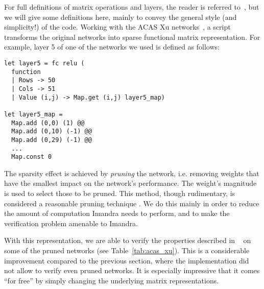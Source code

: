 \documentclass[runningheads]{llncs}
\begin{document}
For full definitions of matrix operations and layers, the reader is referred to~\cite{DPKD22}, but we will give some definitions here, mainly to convey the general style (and simplicity!) of the code.  Working with the ACAS Xu networks~\cite{KaBaDiJuKo17Reluplex}, a script transforms the original networks into sparse functional matrix representation.
For example, layer 5 of one of the networks we used is defined as follows:

\begin{lstlisting}[language=caml]
let layer5 = fc relu (
  function
  | Rows -> 50
  | Cols -> 51
  | Value (i,j) -> Map.get (i,j) layer5_map)

let layer5_map =
  Map.add (0,0) (1) @@
  Map.add (0,10) (-1) @@
  Map.add (0,29) (-1) @@
  ...
  Map.const 0
\end{lstlisting}

\noindent The sparsity effect is achieved by \emph{pruning} the network, i.e. removing weights that have the smallest impact on the network's performance. The weight's magnitude is used to select those to be pruned. This method, though rudimentary, is considered a reasonable pruning technique \cite{lecun_optimal_1989}.
%
We do this mainly in order to reduce the amount of computation Imandra needs to perform, and to make the verification problem amenable to Imandra.

With this representation, we are able to verify the properties described in ~\cite{KaBaDiJuKo17Reluplex} on some of the pruned networks (see Table~\ref{tab:acas_xu}).
This is a considerable improvement compared to the previous section, where the implementation did not allow to verify even pruned networks. It is especially impressive that it comes ``for free'' by simply changing the underlying matrix representations.
\end{document}
